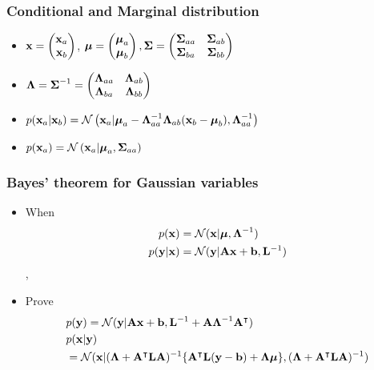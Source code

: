 \documentclass[10pt,mathserif]{beamer}
\begin{document}
\begin{frame}
\frametitle{Conditional and Marginal distribution}
\begin{itemize}\itemsep=12pt
\item $\mathbf{x}=\begin{pmatrix}\mathbf{x}_a\\\mathbf{x}_b\end{pmatrix}$, $\boldsymbol{\mu} = \begin{pmatrix} \boldsymbol{\mu}_a\\\boldsymbol{\mu}_b\end{pmatrix}, \boldsymbol{\Sigma} = \begin{pmatrix}\boldsymbol{\Sigma}_{aa} & \boldsymbol{\Sigma}_{ab}\\ \boldsymbol{\Sigma}_{ba} & \boldsymbol{\Sigma}_{bb} \end{pmatrix}$
\item $\boldsymbol{\Lambda} = \boldsymbol{\Sigma}^{-1}=\begin{pmatrix}\boldsymbol{\Lambda}_{aa} & \boldsymbol{\Lambda}_{ab} \\ \boldsymbol{\Lambda}_{ba} & \boldsymbol{\Lambda}_{bb}\end{pmatrix}$
\item $p(\mathbf{x}_a| \mathbf{x}_b) = \mathcal{N}\left(\mathbf{x}_a| \boldsymbol{\mu}_a - \boldsymbol{\Lambda}_{aa}^{-1}\boldsymbol{\Lambda}_{ab}(\mathbf{x}_b-\boldsymbol{\mu}_b), \boldsymbol{\Lambda}_{aa}^{-1}\right)$ 
\item $p(\mathbf{x}_a) = \mathcal{N}\left(\mathbf{x}_a| \boldsymbol{\mu}_a, \boldsymbol{\Sigma}_{aa} \right)$ 
\end{itemize}
\end{frame}
\begin{frame}
\frametitle{Bayes' theorem for Gaussian variables}
\begin{itemize}\itemsep=12pt
\item When 
    \begin{align}
        p(\mathbf{x}) &= \mathcal{N}(\mathbf{x} | \boldsymbol{\mu}, \boldsymbol{\Lambda}^{-1}) \nonumber\\
        p(\mathbf{y}| \mathbf{x}) &= \mathcal{N}(\mathbf{y} | \mathbf{A}\mathbf{x}+\mathbf{b}, \mathbf{L}^{-1}) \nonumber
    \end{align},
\item Prove
\begin{align}
&p(\mathbf{y}) = \mathcal{N}(\mathbf{y}| \mathbf{A}\mathbf{x} + \mathbf{b}, \mathbf{L}^{-1}+\mathbf{A}\boldsymbol{\Lambda}^{-1}\mathbf{A}^{\intercal})\nonumber\\
&p(\mathbf{x}| \mathbf{y})\nonumber\\
&= \mathcal{N}(\mathbf{x}| (\boldsymbol{\Lambda}+\mathbf{A}^{\intercal}\mathbf{L}\mathbf{A} )^{-1}\{\mathbf{A}^{\intercal}\mathbf{L}(\mathbf{y}-\mathbf{b})+\boldsymbol{\Lambda}\boldsymbol{\mu} \}, (\boldsymbol{\Lambda}+\mathbf{A}^{\intercal}\mathbf{L}\mathbf{A} )^{-1})\nonumber
\end{align}
\end{itemize}
\end{frame}
\end{document}
